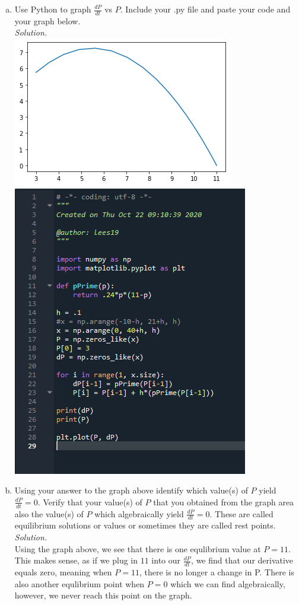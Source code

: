 \documentclass[12pt,letterpaper]{article}
\begin{document}
\begin{enumerate}
\begin{enumerate}[a)]
\item Use Python to graph $\frac{dP}{dt}$ vs $P$. Include your .py file and  paste your code and your graph below.\\
\emph{Solution.}\\
\includegraphics{number5bgraph.png}\\
\includegraphics{number5bcode.png}

\item Using your answer to the graph above identify which value(s) of $P$ yield  $\frac{dP}{dt}=0$. Verify that your value(s) of $P$ that you obtained from the graph area also the value(s) of $P$ which algebraically yield $\frac{dP}{dt}=0$.  These are called equilibrium solutions or values or sometimes they are called rest points.
\\
\emph{Solution.}\\
Using the graph above, we see that there is one equlibrium value at $P = 11$. 
This makes sense, as if we plug in $11$ into our $\frac{dP}{dt}$, we find that 
our derivative equals zero, meaning when $P=11$, there is no longer a change in P.
There is also another equlibrium point when $P=0$ which we can find algebraically,
however, we never reach this point on the graph. 


\end{enumerate}
\end{enumerate}
\end{document}
